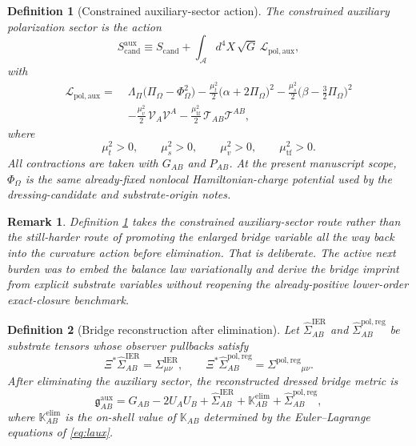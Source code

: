 \documentclass[11pt]{article}
\newcommand{\Sub}{\mathcal{A}}
\newcommand{\BridgeMetric}{\mathfrak g}
\newcommand{\ObserverMap}{\Xi}
\newcommand{\ProjSub}{P}
\newcommand{\FlowPot}{\Phi_\Omega}
\newcommand{\BalanceField}{\Pi_\Omega}
\newcommand{\BalMult}{\Lambda_\Pi}
\newcommand{\SigmaIER}{\Sigma^{\mathrm{IER}}}
\newcommand{\SigmaRegPol}{\Sigma^{\mathrm{pol,reg}}}
\newcommand{\LiftIER}{\widehat\Sigma^{\mathrm{IER}}}
\newcommand{\LiftRegPol}{\widehat\Sigma^{\mathrm{pol,reg}}}
\newcommand{\AuxPol}{\mathbb K}
\newcommand{\CandAction}{S_{\mathrm{cand}}}
\newcommand{\ExtAction}{S_{\mathrm{cand}}^{\mathrm{aux}}}
\newtheorem{definition}{Definition}
\newtheorem{remark}{Remark}
\begin{document}
\begin{definition}[Constrained auxiliary-sector action]
\label{def:action}
The \emph{constrained auxiliary polarization sector} is the action
\begin{equation}
\ExtAction
\equiv
\CandAction
+
\int_{\Sub} d^4X\,\sqrt{G}\,\mathcal L_{\mathrm{pol,aux}},
\label{eq:extaction}
\end{equation}
with
\begin{align}
\mathcal L_{\mathrm{pol,aux}}
=\;&
\BalMult\bigl(\BalanceField-\FlowPot^2\bigr)
-\frac{\mu_t^2}{2}\bigl(\alpha+2\BalanceField\bigr)^2
-\frac{\mu_s^2}{2}\bigl(\beta-\tfrac32\BalanceField\bigr)^2
\nonumber\\
&-\frac{\mu_v^2}{2}\,\mathcal V_A\mathcal V^A
-\frac{\mu_{\mathrm{tf}}^2}{2}\,\mathcal T_{AB}\mathcal T^{AB},
\label{eq:laux}
\end{align}
where
\begin{equation}
\mu_t^2>0,
\qquad
\mu_s^2>0,
\qquad
\mu_v^2>0,
\qquad
\mu_{\mathrm{tf}}^2>0.
\label{eq:masses}
\end{equation}
All contractions are taken with \(G_{AB}\) and \(\ProjSub_{AB}\). At the present manuscript scope, \(\FlowPot\) is the same already-fixed nonlocal Hamiltonian-charge potential used by the dressing-candidate and substrate-origin notes.
\end{definition}

\begin{remark}
Definition \ref{def:action} takes the constrained auxiliary-sector route rather than the still-harder route of promoting the enlarged bridge variable all the way back into the curvature action before elimination. That is deliberate. The active next burden was to embed the balance law variationally and derive the bridge imprint from explicit substrate variables without reopening the already-positive lower-order exact-closure benchmark.
\end{remark}

\begin{definition}[Bridge reconstruction after elimination]
\label{def:bridge}
Let \(\LiftIER_{AB}\) and \(\LiftRegPol_{AB}\) be substrate tensors whose observer pullbacks satisfy
\begin{equation}
\ObserverMap^*\LiftIER_{AB}=\SigmaIER_{\mu\nu},
\qquad
\ObserverMap^*\LiftRegPol_{AB}=\SigmaRegPol{}_{\mu\nu}.
\label{eq:lifts}
\end{equation}
After eliminating the auxiliary sector, the reconstructed dressed bridge metric is
\begin{equation}
\BridgeMetric^{\mathrm{aux}}_{AB}
=
G_{AB}
-2U_AU_B
+\LiftIER_{AB}
+\AuxPol^{\mathrm{elim}}_{AB}
+\LiftRegPol_{AB},
\label{eq:bridgeaux}
\end{equation}
where \(\AuxPol^{\mathrm{elim}}_{AB}\) is the on-shell value of \(\AuxPol_{AB}\) determined by the Euler--Lagrange equations of \eqref{eq:laux}.
\end{definition}
\end{document}
